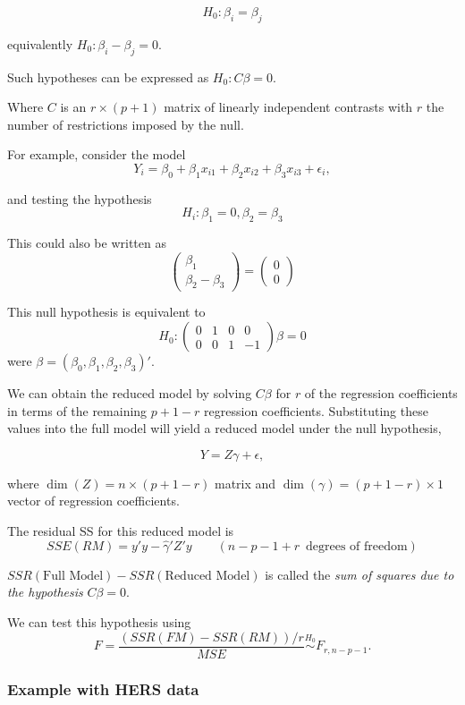 \documentclass[
  letterpaper,
  DIV=11,
  numbers=noendperiod]{scrreport}
\begin{document}
\[H_0: \beta_i = \beta_j\]

equivalently \(H_0: \beta_i - \beta_j = 0\).

Such hypotheses can be expressed as \(H_0: C \beta = 0\).

Where \(C\) is an \(r \times (p+1)\) matrix of linearly independent
contrasts with \(r\) the number of restrictions imposed by the null.

For example, consider the model
\[Y_i = \beta_0 + \beta_1 x_{i1} + \beta_2 x_{i2} + \beta_3 x_{i3} + \epsilon_i,\]

and testing the hypothesis \[H_i : \beta_1 = 0, \beta_2 = \beta_3\]

This could also be written as
\[\left( \begin{array}{c} \beta_1 \\ \beta_2 - \beta_3 \end{array} \right) = 
\left( \begin{array}{c} 0 \\ 0 \end{array} \right)\]

This null hypothesis is equivalent to
\[H_0: \left( \begin{array}{cccc} 0 & 1 & 0 & 0 \\ 0 & 0 & 1 & -1 \end{array} \right)\beta = 0\]
were \(\beta = (\beta_0, \beta_1, \beta_2, \beta_3)'\).

We can obtain the {reduced model} by solving \(C\beta\) for \(r\) of the
regression coefficients in terms of the remaining \(p+1-r\) regression
coefficients. Substituting these values into the full model will yield a
reduced model under the null hypothesis,

\[Y = Z \gamma + \epsilon,\]

where \(\dim(Z) = n \times (p+1 -r)\) matrix and
\(\dim(\gamma) = (p + 1 - r) \times 1\) vector of regression
coefficients.

The residual SS for this reduced model is
\[SSE(RM) = y'y - \hat\gamma' Z'y \quad \quad (n - p - 1 + r \, \text{ degrees of freedom})\]

\(SSR(\text{Full Model}) - SSR(\text{Reduced Model})\) is called the
\emph{sum of squares due to the hypothesis} \(C\beta=0\).

We can test this hypothesis using
\[F = \frac{(SSR(FM)-SSR(RM))/r}{MSE} \stackrel{H_0}{\sim} F_{r,n-p-1}.\]

\hypertarget{example-with-hers-data}{%
\subsubsection{Example with HERS data}\label{example-with-hers-data}}
\end{document}
